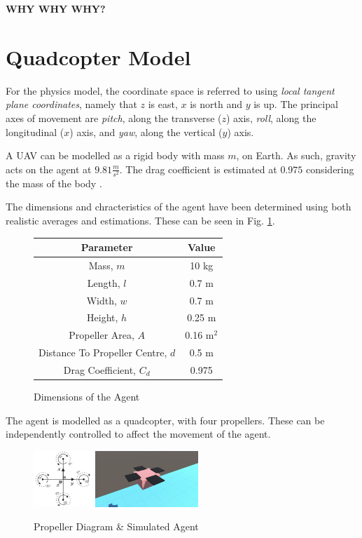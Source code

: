 \documentclass{article}
\begin{document}
\textbf{WHY WHY WHY?}

\section{Quadcopter Model}

For the physics model, the coordinate space is referred to using \emph{local tangent plane coordinates}, namely that $z$ is east, $x$ is north and $y$ is up. The principal axes of movement are \emph{pitch}, along the transverse ($z$) axis, \emph{roll}, along the longitudinal ($x$) axis, and \emph{yaw}, along the vertical ($y$) axis.

A UAV can be modelled as a rigid body with mass $m$, on Earth. As such, gravity acts on the agent at $9.81\frac{m}{s^2}$. The drag coefficient is estimated at $0.975$ considering the mass of the body \cite{Hattenberger}.

The dimensions and chracteristics of the agent have been determined using both realistic averages \cite{Figliozzi} and estimations. These can be seen in Fig. \ref{fig:dimensions}.

\begin{figure}[H]
    \centering
    \begin{tabular}{| c | c |} 
    \hline
    Parameter & Value \\ 
    \hline
    Mass, $m$ & 10 kg \\
    \hline
    Length, $l$ & 0.7 m \\
    \hline
    Width, $w$ & 0.7 m \\
    \hline
    Height, $h$ & 0.25 m \\
    \hline
    Propeller Area, $A$ & 0.16 m$^2$ \\
    \hline
    Distance To Propeller Centre, $d$ & 0.5 m \\
    \hline
    Drag Coefficient, $C_d$ & 0.975 \\
    \hline
    \end{tabular}
    \caption{Dimensions of the Agent}
    \label{fig:dimensions}
\end{figure}

The agent is modelled as a quadcopter, with four propellers. These can be independently controlled to affect the movement of the agent.

\begin{figure}[H]
    \centering
    \includegraphics[height=80px]{prop.png}
    \hspace{1cm}
    \includegraphics[height=80px]{drone-unity.png}
    \caption{Propeller Diagram \& Simulated Agent}
\end{figure}
\end{document}
